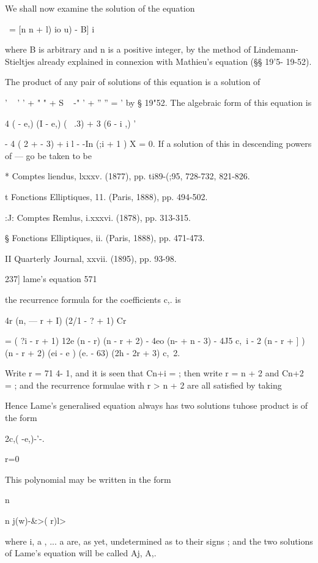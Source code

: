 {{{{{{{{We shall now examine the solution of the equation 

 \  = [n n + l) io u) -  B] i\, 

where B is arbitrary and n is a positive integer, by the method of Lindemann- 
Stieltjes already explained in connexion with Mathieu's equation (§§ 19'5- 
19-52). 

The product of any pair of solutions of this equation is a solution of 

'  ~  ' '  +   " "  +   S ~ -"  '  +   ''  ''  =  ' 
by § 19"52. The algebraic form of this equation is 

4 (  - e,) (I - e,) (  \  .3)   + 3 (6  - i ,) '  

- 4  ( 2 +   - 3)   + i l   - -In (;i + 1 ) X = 0. 
If a solution of this in descending powers of   — go be taken to be 

* Comptes liendus, lxxxv. (1877), pp. ti89-(;95, 728-732, 821-826. 

t Fonctions Elliptiques, 11. (Paris, 1888), pp. 494-502. 

:J: Comptes Remlus, i.xxxvi. (1878), pp. 313-315. 

§ Fonctions Elliptiques, ii. (Paris, 1888), pp. 471-473. 

II Quarterly Journal, xxvii. (1895), pp. 93-98. 



237] lame's equation 571 

the recurrence formula for the coefficients c,. is 

4r (n, — r + I) (2/1 - ?  + 1) Cr 

= ( ?i - r + 1)  12e  (n - r) (n - r + 2) - 4eo (n- + n - 3) - 4J5  c,\ i 
- 2 (n - r + ] ) (n - r + 2) (ei - e ) (e. - 63) (2h - 2r + 3) c,\ 2. 

Write r = 71 4- 1, and it is seen that Cn+i = ; then write r = n + 2 and Cn+2 = ; 
and the recurrence formulae with r > n + 2 are all satisfied by taking 

Hence Lame's generalised equation always has two solutions tuhose product 
is of the form 

2c,( -e,)-'-. 

r=0 

This polynomial may be written in the form 

n 

n   j(w)-\&>( r)l> 

where  i, a , ... a  are, as yet, undetermined as to their signs ; and the two 
solutions of Lame's equation will be called Aj, A,. 

}}}}}}}}
